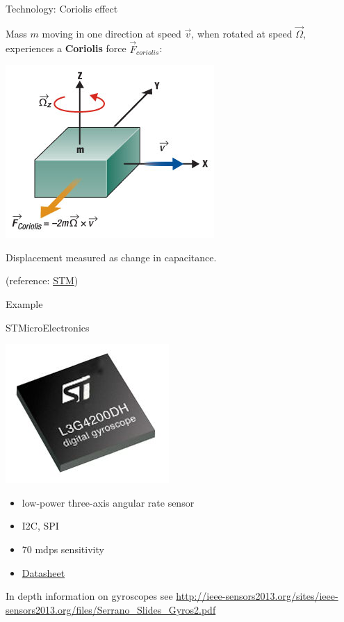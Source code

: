 \documentclass[compress]{beamer}
\begin{document}
\begin{frame}{Technology: Coriolis effect}

    Mass $m$ moving in one direction at speed $\vec{v}$, when rotated at speed $\vec\Omega$,
    experiences a {\bf Coriolis} force $\vec{F}_{coriolis}$:

        \begin{center}
            \includegraphics[width=0.5\linewidth]{coriolis}
        \end{center}
    Displacement measured as change in capacitance.


    (reference: \href{http://electroiq.com/blog/2010/11/introduction-to-mems-gyroscopes/}{STM})

\end{frame}

\begin{frame}{Example}

STMicroElectronics

    \begin{center}
        \includegraphics[width=0.3\linewidth]{stm_gyro}
    \end{center}

\begin{itemize}

\item
  low-power three-axis angular rate sensor
\item
  I2C, SPI
\item
  70 mdps sensitivity
\item
  \href{http://www.st.com/web/en/resource/technical/document/datasheet/CD00265057.pdf}{Datasheet}
\end{itemize}

\small
    In depth information on gyroscopes see \url{http://ieee-sensors2013.org/sites/ieee-sensors2013.org/files/Serrano_Slides_Gyros2.pdf}

\end{frame}
\end{document}
